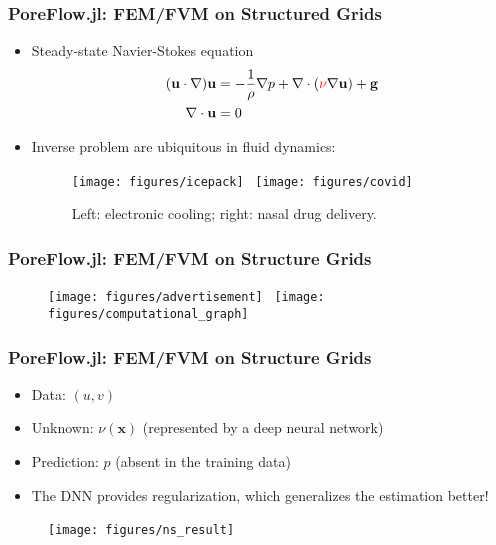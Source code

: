 \documentclass[usenames,dvipsnames]{beamer}
\begin{document}
\begin{frame}
	\frametitle{PoreFlow.jl: FEM/FVM on Structured Grids}
	\begin{itemize}
		\item Steady-state Navier-Stokes equation
		\begin{equation*}
	\begin{aligned}
		(\mathbf{u} \cdot \nabla) \mathbf{u} &=
    -\frac{1}{\rho} \nabla p + \nabla\cdot (\textcolor{red}{\nu} \nabla \mathbf{u}) + \mathbf{g}\\
\nabla \cdot \mathbf{u} &= 0
	\end{aligned}
    \end{equation*}
    
    \item Inverse problem are ubiquitous in fluid dynamics:
    
    \begin{figure}[hbt]
    \centering
  \texttt{[image: figures/icepack]}~
  \texttt{[image: figures/covid]}
  \caption{Left: electronic cooling; right: nasal drug delivery.}
\end{figure}

	\end{itemize}
	    
  \end{frame}
  
  
  \begin{frame}
  	\frametitle{PoreFlow.jl: FEM/FVM on Structure Grids}
  	
  	\begin{figure}[hbt]
    \centering
  \texttt{[image: figures/advertisement]}~
  \texttt{[image: figures/computational\_graph]}
\end{figure}
  \end{frame}

  
  
  \begin{frame}
  	\frametitle{PoreFlow.jl: FEM/FVM on Structure Grids}
\begin{itemize}
	\item Data: $(u, v)$
	\item Unknown: $\nu(\mathbf{x})$ (represented by a deep neural network)
	\item Prediction: $p$ (absent in the training data) 
	\item The DNN provides regularization, which generalizes the estimation better!
	\end{itemize}
  	\begin{figure}[hbt]
    \centering
  \texttt{[image: figures/ns\_result]}~
\end{figure}
  \end{frame}
\end{document}
